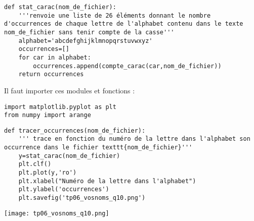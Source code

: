\question{}

\begin{lstlisting}
def stat_carac(nom_de_fichier):
    '''renvoie une liste de 26 éléments donnant le nombre d'occurrences de chaque lettre de l'alphabet contenu dans le texte nom_de_fichier sans tenir compte de la casse'''
    alphabet='abcdefghijklmnopqrstuvwxyz'
    occurrences=[]
    for car in alphabet:
        occurrences.append(compte_carac(car,nom_de_fichier))
    return occurrences
\end{lstlisting}


\question{}

Il faut importer ces modules et fonctions : 
\begin{lstlisting}
import matplotlib.pyplot as plt
from numpy import arange
\end{lstlisting}

\begin{minipage}{0.5\textwidth}

\begin{lstlisting}
def tracer_occurrences(nom_de_fichier):
    ''' trace en fonction du numéro de la lettre dans l'alphabet son occurrence dans le fichier texttt{nom_de_fichier}'''
    y=stat_carac(nom_de_fichier)
    plt.clf()
    plt.plot(y,'ro')
    plt.xlabel("Numéro de la lettre dans l'alphabet")
    plt.ylabel('occurrences')
    plt.savefig('tp06_vosnoms_q10.png')
\end{lstlisting}

\end{minipage}
\begin{minipage}{0.5\textwidth}
\begin{center}
\texttt{[image: tp06\_vosnoms\_q10.png]}
\end{center}
\end{minipage}


%
%
%

